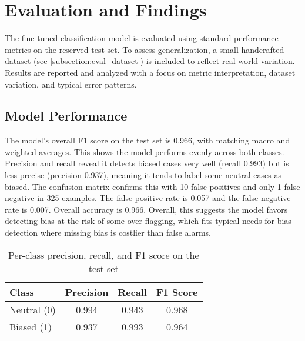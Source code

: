 \chapter{Evaluation and Findings}
    The fine-tuned classification model is evaluated using standard performance metrics on the reserved test set. To assess generalization, a small handcrafted dataset (see \autoref{subsection:eval_dataset}) is included to reflect real-world variation. Results are reported and analyzed with a focus on metric interpretation, dataset variation, and typical error patterns.

\section{Model Performance}
    The model’s overall F1 score on the test set is 0.966, with matching macro and weighted averages. This shows the model performs evenly across both classes. Precision and recall reveal it detects biased cases very well (recall 0.993) but is less precise (precision 0.937), meaning it tends to label some neutral cases as biased. The confusion matrix confirms this with 10 false positives and only 1 false negative in 325 examples. The false positive rate is 0.057 and the false negative rate is 0.007. Overall accuracy is 0.966. Overall, this suggests the model favors detecting bias at the risk of some over-flagging, which fits typical needs for bias detection where missing bias is costlier than false alarms.

        \vspace{0.8em}
        \begin{table}[H]
            \centering
            \begin{tabular}{lccc}
            \toprule
            \textbf{Class} & \textbf{Precision} & \textbf{Recall} & \textbf{F1 Score} \\
            \midrule
            Neutral (0) & 0.994 & 0.943 & 0.968 \\
            Biased (1)  & 0.937 & 0.993 & 0.964 \\
            \bottomrule
            \end{tabular}
            \caption{Per-class precision, recall, and F1 score on the test set}
        \end{table}

